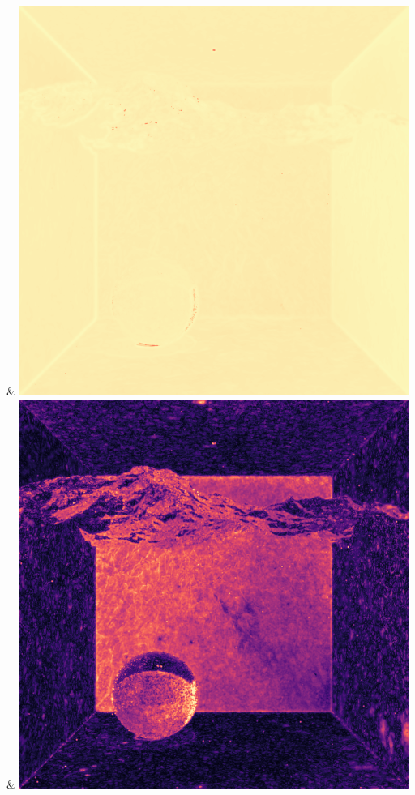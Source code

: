 & \includegraphics[width=\linewidth]{figures/py/tests/quality_comparison/nrc+lt_1spp_caustics_small_flip.png}
& \includegraphics[width=\linewidth]{figures/py/tests/quality_comparison/nrc+sppc_1spp_caustics_small_flip.png}
